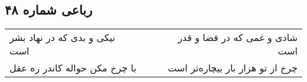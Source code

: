 \begin{center}
\section*{رباعی شماره ۴۸}
\label{sec:sh048}
\begin{longtable}{l p{0.5cm} r}
نیکی و بدی که در نهاد بشر است
&&
شادی و غمی که در قضا و قدر است
\\
با چرخ مکن حواله کاندر ره عقل
&&
چرخ از تو هزار بار بیچاره‌تر است
\\
\end{longtable}
\end{center}
